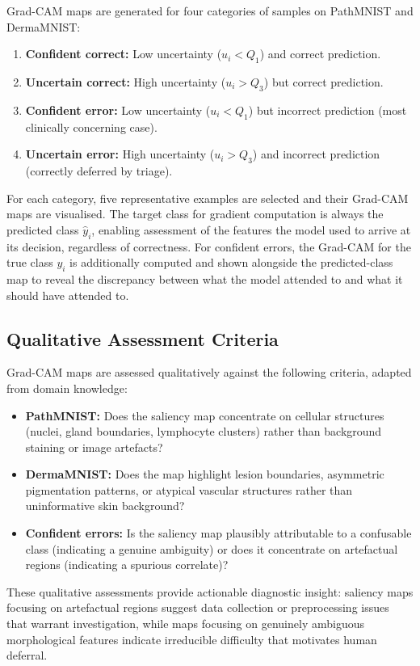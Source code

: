 Grad-CAM maps are generated for four categories of samples on PathMNIST and DermaMNIST:
\begin{enumerate}
    \item \textbf{Confident correct:} Low uncertainty ($u_i < Q_1$) and correct prediction.
    \item \textbf{Uncertain correct:} High uncertainty ($u_i > Q_3$) but correct prediction.
    \item \textbf{Confident error:} Low uncertainty ($u_i < Q_1$) but incorrect prediction (most clinically concerning case).
    \item \textbf{Uncertain error:} High uncertainty ($u_i > Q_3$) and incorrect prediction (correctly deferred by triage).
\end{enumerate}
For each category, five representative examples are selected and their Grad-CAM maps are visualised. The target class for gradient computation is always the predicted class $\hat{y}_i$, enabling assessment of the features the model used to arrive at its decision, regardless of correctness. For confident errors, the Grad-CAM for the true class $y_i$ is additionally computed and shown alongside the predicted-class map to reveal the discrepancy between what the model attended to and what it should have attended to.

\subsection{Qualitative Assessment Criteria}

Grad-CAM maps are assessed qualitatively against the following criteria, adapted from domain knowledge:
\begin{itemize}
    \item \textbf{PathMNIST:} Does the saliency map concentrate on cellular structures (nuclei, gland boundaries, lymphocyte clusters) rather than background staining or image artefacts?
    \item \textbf{DermaMNIST:} Does the map highlight lesion boundaries, asymmetric pigmentation patterns, or atypical vascular structures rather than uninformative skin background?
    \item \textbf{Confident errors:} Is the saliency map plausibly attributable to a confusable class (indicating a genuine ambiguity) or does it concentrate on artefactual regions (indicating a spurious correlate)?
\end{itemize}
These qualitative assessments provide actionable diagnostic insight: saliency maps focusing on artefactual regions suggest data collection or preprocessing issues that warrant investigation, while maps focusing on genuinely ambiguous morphological features indicate irreducible difficulty that motivates human deferral.
